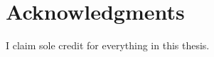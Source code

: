 \documentclass[a4paper,11pt,twoside]{ThesisStyle}
\begin{document}


\section*{Acknowledgments}

I claim sole credit for everything in this thesis.

\newpage

\tableofcontents
\mainmatter







% 

\listoffigures
%  
\listoftables




\end{document}
